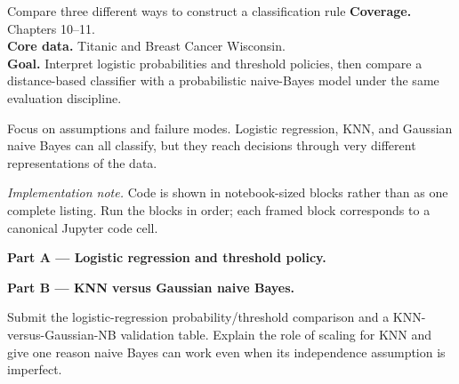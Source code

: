 
\begin{labproject}{Compare three different ways to construct a classification rule}
\textbf{Coverage.} Chapters 10--11.\\
\textbf{Core data.} Titanic and Breast Cancer Wisconsin.\\
\textbf{Goal.} Interpret logistic probabilities and threshold policies, then compare a distance-based classifier with a probabilistic naive-Bayes model under the same evaluation discipline.

\begin{labmode}
Focus on assumptions and failure modes. Logistic regression, KNN, and Gaussian naive Bayes can all classify, but they reach decisions through very different representations of the data.
\end{labmode}

\smallskip\noindent\textit{Implementation note.} Code is shown in notebook-sized blocks rather than as one complete listing. Run the blocks in order; each framed block corresponds to a canonical Jupyter code cell.\par

\medskip\noindent\textbf{Part A --- Logistic regression and threshold policy.}\par






\medskip\noindent\textbf{Part B --- KNN versus Gaussian naive Bayes.}\par






\end{labproject}

\begin{labdeliverable}
Submit the logistic-regression probability/threshold comparison and a KNN-versus-Gaussian-NB validation table. Explain the role of scaling for KNN and give one reason naive Bayes can work even when its independence assumption is imperfect.
\end{labdeliverable}
